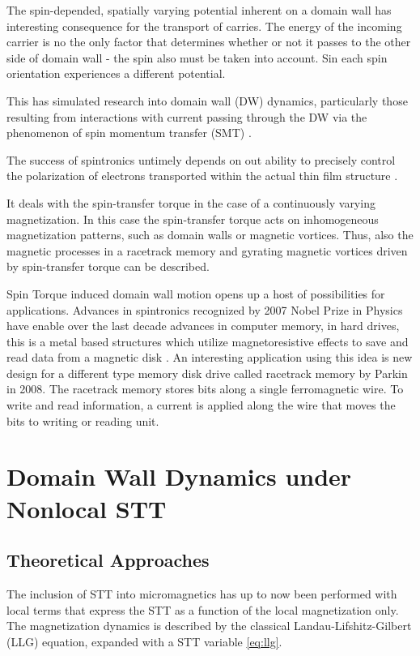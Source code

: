 The spin-depended, spatially varying potential inherent on a domain wall has interesting consequence for the transport of carries. The energy of the incoming  carrier is no the only factor that determines whether or not it passes to the other side of domain wall - the spin also must be taken into account. Sin each spin orientation experiences a different potential.

This has simulated research into domain wall (DW) dynamics, particularly those resulting from interactions with current passing through the DW via the phenomenon of spin momentum transfer (SMT) \cite{handbookspin}.
 
 The success of spintronics untimely depends on out ability to precisely  control the polarization of electrons transported within the actual thin film structure \cite{ferro}.


It deals with the spin-transfer torque in the case of a continuously varying magnetization. In this case the spin-transfer torque acts on inhomogeneous magnetization patterns, such as domain walls or magnetic vortices. Thus, also the magnetic processes in a racetrack memory and gyrating magnetic vortices driven by spin-transfer torque  can be described.

Spin Torque induced domain wall motion opens up a host of possibilities for applications. Advances in spintronics recognized by 2007 Nobel Prize in Physics have enable over the last decade advances in computer memory, in hard drives, this is a metal based structures which utilize magnetoresistive effects to save and read data from a magnetic disk \cite{handbookspin}. An interesting application using this idea is new design for a different type memory disk drive called racetrack memory by Parkin in 2008\cite{racetrack}. The racetrack memory stores bits along a single ferromagnetic wire. To write and read information, a current is applied along the wire that moves the bits to writing or reading unit.
 
 
\section{Domain Wall Dynamics under Nonlocal STT}


\subsection{Theoretical Approaches}

The inclusion of STT into micromagnetics has up to now been performed with local terms that express the STT as a function of the local magnetization only. The magnetization dynamics is described by the classical Landau-Lifshitz-Gilbert (LLG) equation, expanded with a STT variable \ref{eq:llg}.

